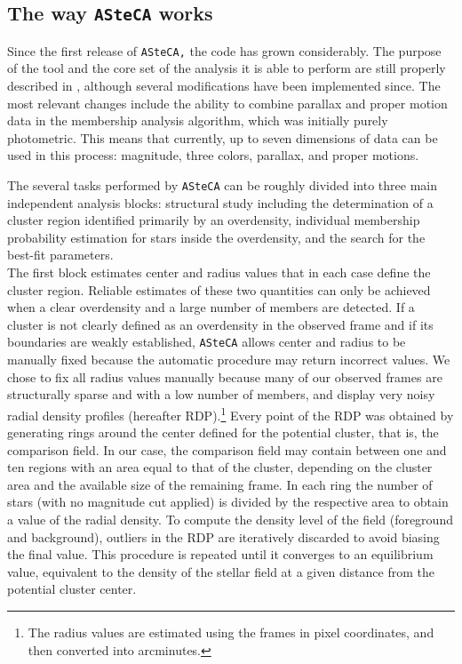 \documentclass[draft]{aa}
\begin{document}
\subsection{The way \texttt{ASteCA} works}
\label{ssec:asteca_works}

Since the first release of \texttt{ASteCA,} the code has grown
considerably. The purpose of the tool and the core set of the analysis it is able
to perform are still properly described in \cite{Perren_2015}, although
several modifications have been implemented since. The most relevant changes
include the ability to combine parallax and proper motion data in the
membership analysis algorithm, which was initially purely photometric. This
means that currently, up to seven dimensions of data can be used in this process:
magnitude, three colors, parallax, and proper motions.

The several tasks performed by \texttt{ASteCA} can be roughly divided into three
main independent analysis blocks: structural study including the
determination of a cluster region identified primarily by an overdensity,
individual membership probability estimation for stars inside the overdensity,
and the search for the best-fit parameters.\\

The first block estimates center and radius values that in each case define the
cluster region. Reliable estimates of these two quantities can only be achieved
when a clear overdensity and a large number of members are detected.
If a cluster is not clearly defined as an overdensity in the observed frame and
if its boundaries are weakly established, \texttt{ASteCA} allows center and
radius to be manually fixed because the automatic procedure may return incorrect
values. We chose to fix all radius values manually because many of
our observed frames are structurally sparse and with a low number of members,
and display very noisy radial density profiles (hereafter RDP).\footnote{
The radius values are estimated using the frames in pixel coordinates,
and then converted into arcminutes.
}
%
Every point of the RDP was obtained by generating rings around the
center defined for the potential cluster, that is, the comparison field.
%
In our case, the comparison field may contain between one and ten regions
with an area equal to that of the cluster, depending on the cluster area and the
available size of the remaining frame. In each ring the number of
stars (with no magnitude cut applied) is divided by the respective
area to obtain a value of the radial density.
%
To compute the density level of the field (foreground and background),
outliers in the RDP are iteratively discarded to avoid biasing the final value.
This procedure is repeated until it converges to an equilibrium value, equivalent
to the density of the stellar field at a given distance from the potential
cluster center.
\end{document}
